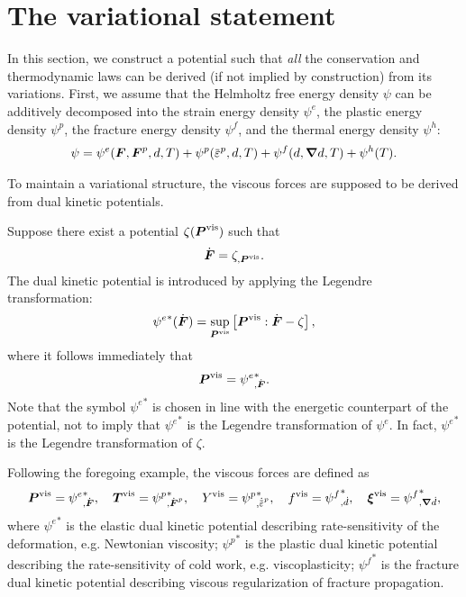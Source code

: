\section{The variational statement}
\label{section: Chapter2/minimization}

In this section, we construct a potential such that \emph{all} the conservation and thermodynamic laws can be derived (if not implied by construction) from its variations. First, we assume that the Helmholtz free energy density $\psi$ can be additively decomposed into the strain energy density $\psi^e$, the plastic energy density $\psi^p$, the fracture energy density $\psi^f$, and the thermal energy density $\psi^h$:
\begin{align}
  \psi = \psi^e(\defgrad, \defgrad^p, d, T) + \psi^p(\ep, d, T) + \psi^f(d, \grad d, T) + \psi^h(T). \label{eq: energies}
\end{align}

To maintain a variational structure, the viscous forces are supposed to be derived from dual kinetic potentials.

\begin{example}
  \vspace{-0.5em}
  Suppose there exist a potential $\zeta(\boldsymbol{P}^\text{vis})$ such that
  \begin{align}
    \dot{\boldsymbol{F}} = \zeta_{,\boldsymbol{P}^\text{vis}}.
  \end{align}
  The dual kinetic potential is introduced by applying the Legendre transformation:
  \begin{align}
    {\psi^e}^*(\dot{\boldsymbol{F}}) = \sup_{\boldsymbol{P}^\text{vis}}\left[ \boldsymbol{P}^\text{vis}:\dot{\boldsymbol{F}} - \zeta \right],
  \end{align}
  where it follows immediately that
  \begin{align}
    \boldsymbol{P}^\text{vis} = {\psi^e}^*_{,\dot{\boldsymbol{F}}}.
  \end{align}
  Note that the symbol ${\psi^e}^*$ is chosen in line with the energetic counterpart of the potential, not to imply that ${\psi^e}^*$ is the Legendre transformation of $\psi^e$. In fact, ${\psi^e}^*$ is the Legendre transformation of $\zeta$.
\end{example}

Following the foregoing example, the viscous forces are defined as
\begin{align}
  \bfP^\text{vis} = {\psi^e}^*_{,\dot{\defgrad}}, \quad \bfT^\text{vis} = {\psi^p}^*_{,\dot{\defgrad}^p}, \quad Y^\text{vis} = {\psi^p}^*_{,\epdot}, \quad f^\text{vis} = {\psi^f}^*_{,\dot{d}}, \quad \bs{\xi}^\text{vis} = {\psi^f}^*_{,\grad\dot{d}},
\end{align}
where ${\psi^e}^*$ is the elastic dual kinetic potential describing rate-sensitivity of the deformation, e.g. Newtonian viscosity; ${\psi^p}^*$ is the plastic dual kinetic potential describing the rate-sensitivity of cold work, e.g. viscoplasticity; ${\psi^f}^*$ is the fracture dual kinetic potential describing viscous regularization of fracture propagation.

